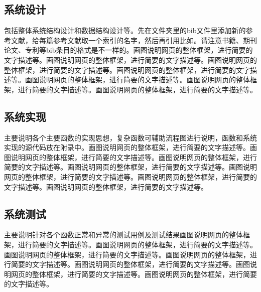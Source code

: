 \documentclass[supercite]{Experimental_Report}
\theoremstyle{definition}
\begin{document}
\subsection{系统设计}

包括整体系统结构设计和数据结构设计等。先在文件夹里的bib文件里添加新的参考文献，给每篇参考文献取一个索引的名字，然后再引用比如\cite{STR2021Neurocom}\cite{AVS2021Neurocom, Rezaei2014CVPR}。请注意书籍、期刊论文、专利等bib条目的格式是不一样的。画图说明网页的整体框架，进行简要的文字描述等。画图说明网页的整体框架，进行简要的文字描述等。画图说明网页的整体框架，进行简要的文字描述等。画图说明网页的整体框架，进行简要的文字描述等。画图说明网页的整体框架，进行简要的文字描述等。画图说明网页的整体框架，进行简要的文字描述等。画图说明网页的整体框架，进行简要的文字描述等。

\subsection{系统实现}

主要说明各个主要函数的实现思想，复杂函数可辅助流程图进行说明，函数和系统实现的源代码放在附录中。画图说明网页的整体框架，进行简要的文字描述等。画图说明网页的整体框架，进行简要的文字描述等。画图说明网页的整体框架，进行简要的文字描述等。画图说明网页的整体框架，进行简要的文字描述等。画图说明网页的整体框架，进行简要的文字描述等。画图说明网页的整体框架，进行简要的文字描述等。画图说明网页的整体框架，进行简要的文字描述等。

\subsection{系统测试}

主要说明针对各个函数正常和异常的测试用例及测试结果画图说明网页的整体框架，进行简要的文字描述等。画图说明网页的整体框架，进行简要的文字描述等。画图说明网页的整体框架，进行简要的文字描述等。画图说明网页的整体框架，进行简要的文字描述等。画图说明网页的整体框架，进行简要的文字描述等。画图说明网页的整体框架，进行简要的文字描述等。画图说明网页的整体框架，进行简要的文字描述等。
\end{document}
